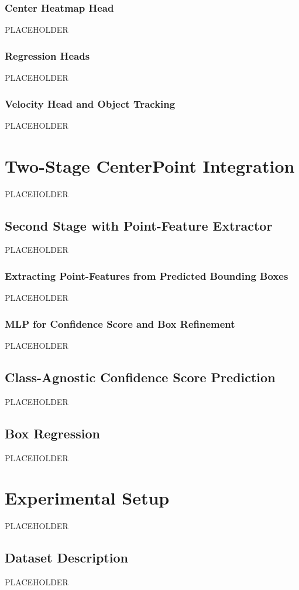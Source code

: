 \documentclass[twocolumn, times]{article}
\begin{document}
\subsubsection{Center Heatmap Head}
PLACEHOLDER

\subsubsection{Regression Heads}
PLACEHOLDER

\subsubsection{Velocity Head and Object Tracking}
PLACEHOLDER

\section{Two-Stage CenterPoint Integration}
PLACEHOLDER

\subsection{Second Stage with Point-Feature Extractor}
PLACEHOLDER

\subsubsection{Extracting Point-Features from Predicted Bounding Boxes}
PLACEHOLDER

\subsubsection{MLP for Confidence Score and Box Refinement}
PLACEHOLDER

\subsection{Class-Agnostic Confidence Score Prediction}
PLACEHOLDER

\subsection{Box Regression}
PLACEHOLDER

\section{Experimental Setup}
PLACEHOLDER

\subsection{Dataset Description}
PLACEHOLDER
\end{document}

